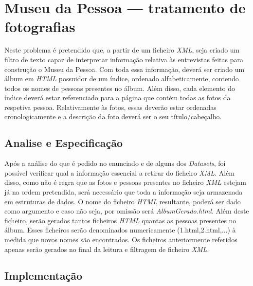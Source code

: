 \chapter{Museu da Pessoa — tratamento de fotografias}
\label{cap:museu}
Neste problema é pretendido que, a partir de um ficheiro \emph{XML}, seja criado um filtro de texto capaz de interpretar informação relativa às entrevistas feitas para construção o Museu da Pessoa. Com toda essa informação, deverá ser criado um álbum em \emph{HTML} possuidor de um índice, ordenado alfabeticamente, contendo todos os nomes de pessoas presentes no álbum. Além disso, cada elemento do índice deverá estar referenciado para a página que contém todas as fotos da respetiva pessoa. Relativamente às fotos, essas deverão estar ordenadas cronologicamente e a descrição da foto deverá ser o seu título/cabeçalho.

\section{Analise e Especificação}
\label{seq:museu-ana}
Após a análise do que é pedido no enunciado e de alguns dos \emph{Datasets}, foi possível verificar qual a informação essencial a retirar do ficheiro \emph{XML}. Além disso, como não é regra que as fotos e pessoas presentes no ficheiro \emph{XML} estejam já na ordem pretendida, será necessário que toda a informação seja armazenada em estruturas de dados. O nome do ficheiro \emph{HTML} resultante, poderá ser dado como argumento e caso não seja, por omissão será \emph{AlbumGerado.html}. Além deste ficheiro, serão gerados tantos ficheiros \emph{HTML} quantas as pessoas presentes no álbum. Esses ficheiros serão denominados numericamente (1.html,2.html,...) à medida que novos nomes são encontrados. Os ficheiros anteriormente referidos apenas serão gerados no final da leitura e filtragem de ficheiro \emph{XML}.


\section{Implementação}
\label{seq:museu-imp}

